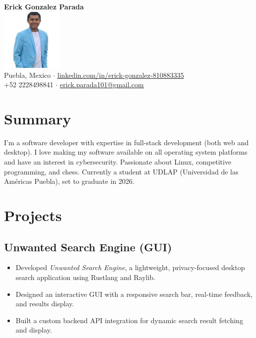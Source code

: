 \documentclass[a4paper,10pt]{article}
\begin{document}
\begin{center}
    {\LARGE \textbf{Erick Gonzalez Parada}} \\
    \vspace{0.3cm}
    \includegraphics[width=3cm]{profpic.jpeg} \\
    \vspace{0.3cm}
    Puebla, Mexico $\cdot$ \underline{\href{https://linkedin.com/in/erick-gonzalez-810883335}{linkedin.com/in/erick-gonzalez-810883335}} \\
    +52 2228498841 $\cdot$ \underline{\href{mailto:erick.parada101@gmail.com}{erick.parada101@gmail.com}}
\end{center}



\section*{Summary}
I'm a software developer with expertise in full-stack development (both web and desktop). I love making my software available on all operating system platforms and have an interest in cybersecurity. Passionate about Linux, competitive programming, and chess. Currently a student at UDLAP (Universidad de las Américas Puebla), set to graduate in 2026.

\section*{Projects}
\subsection*{Unwanted Search Engine (GUI)}
\begin{itemize}
    \item Developed \textit{Unwanted Search Engine}, a lightweight, privacy-focused desktop search application using Rustlang and Raylib.
    \item Designed an interactive GUI with a responsive search bar, real-time feedback, and results display.
    \item Built a custom backend API integration for dynamic search result fetching and display.
\end{itemize}
\end{document}
